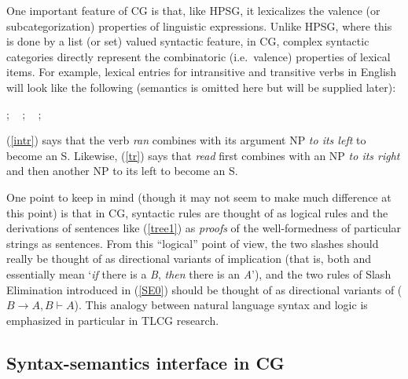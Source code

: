 \documentclass[output=paper
                ,modfonts
                ,nonflat
	        ,collection
	        ,collectionchapter
	        ,collectiontoclongg
 	        ,biblatex
                ,babelshorthands
                ,newtxmath
                ,draftmode
                ,colorlinks, citecolor=brown
]{./langsci/langscibook}
\begin{document}
One important feature of CG is that, like HPSG, it lexicalizes the
valence (or subcategorization) properties of linguistic expressions.
Unlike HPSG, where this is done by a list (or set) valued syntactic
feature, in CG, complex syntactic categories directly represent the
combinatoric (i.e.~valence) properties of lexical items. For example,
lexical entries for intransitive and transitive verbs in English will
look like the following (semantics is omitted here but will be
supplied later):

\begin{exe}
 \ex\label{lex1}
  \begin{xlist}
 \ex\label{intr}
    ; \  
 \ex\label{tr}
    ; \ 
 \ex\label{trthree}
    ; \ 
  \end{xlist}
\end{exe}
(\ref{intr}) says that the verb \textit{ran} combines with its argument NP \emph{to its
left} to become an S. Likewise, (\ref{tr}) says that \textit{read} first
combines with an NP \emph{to its right} and then another NP to its left to
become an S.

One point to keep in mind (though it may not seem to make much
difference at this point) is that in CG, syntactic rules are
thought of as logical rules and the derivations of sentences like
(\ref{tree1}) as \emph{proofs} of the well-formedness of
particular strings as sentences.
From this ``logical'' point of view, the two slashes should really be
thought of as directional variants of implication (that is, both
 and  essentially mean `\emph{if} there is a \textit{B},
\emph{then} there is an \textit{A}'), and the two rules of Slash Elimination
introduced in (\ref{SE0})
should be thought of as directional variants of 
($B \ensuremath{ \rightarrow } A, B  \ensuremath{\vdash\xspace } A$). This analogy between natural language
syntax and logic is emphasized in particular in TLCG research.


\subsection{Syntax-semantics interface in CG \label{interface}}
\end{document}
